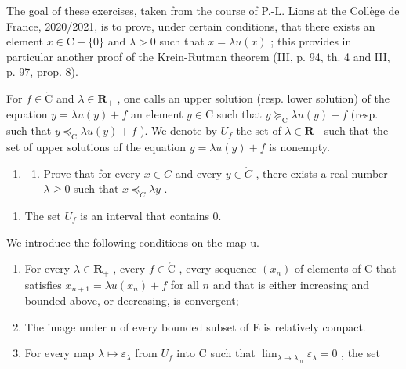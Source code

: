 The goal of these exercises, taken from the course of P.-L. Lions at the Collège de France, 2020/2021, is to prove, under certain conditions, that there exists an element \(x \in \mathrm{C} - \{0\}\) and \(\lambda > 0\) such that \(x = \lambda u(x)\) ; this provides in particular another proof of the Krein-Rutman theorem (III, p. 94, th. 4 and III, p. 97, prop. 8).

For \(f \in \mathring{\mathrm{C}}\) and \(\lambda \in \mathbf{R}_{+}\) , one calls an upper solution (resp. lower solution) of the equation \(y = \lambda u(y) + f\) an element \(y \in \mathrm{C}\) such that \(y \succcurlyeq_{\mathrm{C}} \lambda u(y) + f\) (resp. such that \(y \preccurlyeq_{\mathrm{C}} \lambda u(y) + f\) ). We denote by \(U_{f}\) the set of \(\lambda \in \mathbf{R}_{+}\) such that the set of upper solutions of the equation \(y = \lambda u(y) + f\) is nonempty.

\begin{enumerate}
\def\labelenumi{\arabic{enumi})}
\setcounter{enumi}{24}
\tightlist
\item
  \begin{enumerate}
  \def\labelenumii{\alph{enumii})}
  \tightlist
  \item
    Prove that for every \(x \in C\) and every \(y \in \mathring{C}\) , there exists a real number \(\lambda \geqslant 0\) such that \(x \preccurlyeq_{C} \lambda y\) .
  \end{enumerate}
\end{enumerate}

\begin{enumerate}
\def\labelenumi{\alph{enumi})}
\setcounter{enumi}{1}
\tightlist
\item
  The set \(U_{f}\) is an interval that contains 0.
\end{enumerate}

We introduce the following conditions on the map u.

\begin{enumerate}
\def\labelenumi{(\roman{enumi})}
\setcounter{enumi}{3}
\item
  For every \(\lambda \in \mathbf{R}_{+}\) , every \(f \in \mathring{\mathrm{C}}\) , every sequence \((x_{n})\) of elements of C that satisfies \(x_{n+1} = \lambda u(x_{n}) + f\) for all \(n\) and that is either increasing and bounded above, or decreasing, is convergent;
\item
  The image under u of every bounded subset of E is relatively compact.
\item
  For every map \(\lambda \mapsto \varepsilon_{\lambda}\) from \(U_f\) into C such that \(\lim_{\lambda \to \lambda_m} \varepsilon_{\lambda} = 0\) , the set
\end{enumerate}

